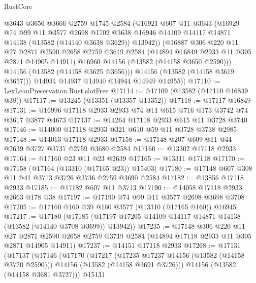 \begin{lexlean}{RustCore}
\begin{coremodule}
            @3643
            @3656
            @3666
            @2759
            @1745
            @2584
            (@16921
              @607
              @11
              @3643
              (@16929
                @74
                @99
                @11
                @3577
                @2698
                @1702
                @3638
                @16946
                @14109
                @14117
                @14871
                @14138
                (@13582 (@14140 @3638 @3629))
                @13942))
            (@16887
              @306
              @220
              @11
              @27
              @2871
              @2590
              @2658
              @2759
              @3649
              @2584
              (@14894 @16849 @2933 @11 @305 @2871 @14905 @14911)
              @16960
              @14156
              (@13582 (@14158 @3650 @2590)))
            @14156
            (@13582 (@14158 @3625 @3656)))
          @14156
          (@13582 (@14158 @3619 @3657)))
        @14934
        @14937
        @14940
        @14944
        @14949
        @14955))
@17110 := LexLeanPreservation.Rust.slotFree
@17114 := @17109 (@13582 (@17110 @16849 @38))
@17117 := @13245 (@13351 (@13357 @13352))
@17118 := @17117 @16849
@17131 := @16996 @17118 @2933 @2933 @74 @11 @615 @716 @173 @3742 @74 @3617 @3877 @4673
@17137 := @14264 @17118 @2933 @615 @11 @3728 @3740
@17146 := @14000 @17118 @2933 @321 @610 @59 @11 @3728 @3738 @2985
@17148 := @14013 @17118 @2933
@17158 := @17148 @207 @609 @11 @44 @2639 @3727 @3737 @2759 @3680 @2584
@17160 := @13302 @17118 @2933
@17164 := @17160 @23 @11 @23 @2639
@17165 := @13311 @17118
@17170 := @17158 (@17164 (@13310 (@17165 @23)) @15403)
@17180 := @17148 @607 @308 @11 @41 @3713 @3726 @3736 @2759 @3690 @2584
@17182 := @13856 @17118 @2933
@17185 := @17182 @607 @11 @3713
@17190 := @14058 @17118 @2933 @2663 @178 @38
@17197 := @17190 @74 @99 @11 @3577 @2698 @3698 @3708
@17205 := @17160 @160 @39 @160 @3577 (@13310 (@17165 @160)) @16945
@17217 := @17180
    (@17185 (@17197 @17205 @14109 @14117 @14871 @14138 (@13582 (@14140 @3708 @3699)) @13942))
@17235 := @17148
    @306
    @220
    @11
    @27
    @2871
    @2590
    @2658
    @2759
    @3719
    @2584
    (@14894 @17118 @2933 @11 @305 @2871 @14905 @14911)
@17237 := @14151 @17118 @2933
@17268 := @17131
    (@17137
      (@17146
        (@17170
          (@17217
            (@17235 @17237 @14156 (@13582 (@14158 @3720 @2590)))
            @14156
            (@13582 (@14158 @3691 @3726)))
          @14156
          (@13582 (@14158 @3681 @3727)))
        @15131

\end{coremodule}
\end{lexlean}
